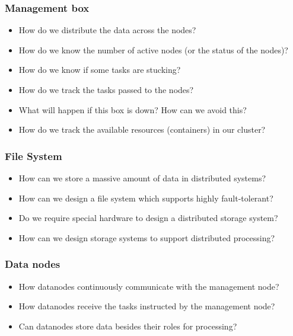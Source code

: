 \begin{frame}
	\frametitle{Management box}
	\begin{itemize} [<+->]
		\item How do we distribute the data across the nodes?
		\item How do we know the number of active nodes (or the status of the nodes)?
		\item How do we know if some tasks are stucking?
		\item How do we track the tasks passed to the nodes?
		\item What will happen if this box is down? How can we avoid this?
		\item How do we track the available resources (containers) in our cluster?
	\end{itemize}
\end{frame}

\begin{frame}
	\frametitle{File System}
	\begin{itemize} [<+->]
        \item How can we store a massive amount of data in distributed systems?
        \item How can we design a file system which supports highly fault-tolerant?
        \item Do we require special hardware to design a distributed storage system?
        \item How can we design storage systems to support distributed processing?
	\end{itemize}
\end{frame}
\begin{frame}
	\frametitle{Data nodes}
	\begin{itemize} [<+->]
        \item How datanodes continuously communicate with the management node?
        \item How datanodes receive the tasks instructed by the management node?
        \item Can datanodes store data besides their roles for processing?
	\end{itemize}
\end{frame}

